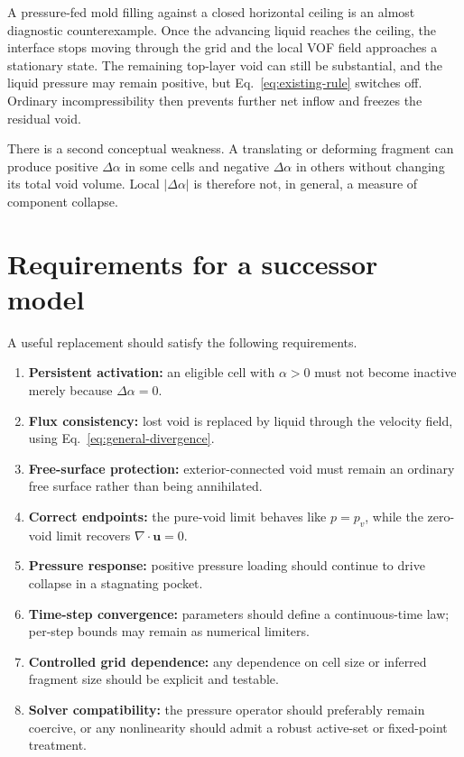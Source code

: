 \documentclass[11pt]{article}
\newcommand{\divg}{\nabla\!\cdot}
\newcommand{\uv}{\boldsymbol{u}}
\begin{document}
A pressure-fed mold filling against a closed horizontal ceiling is an almost diagnostic
counterexample.  Once the advancing liquid reaches the ceiling, the interface stops
moving through the grid and the local VOF field approaches a stationary state.  The
remaining top-layer void can still be substantial, and the liquid pressure may remain
positive, but Eq.~\eqref{eq:existing-rule} switches off.  Ordinary incompressibility then
prevents further net inflow and freezes the residual void.

There is a second conceptual weakness.  A translating or deforming fragment can produce
positive \(\Delta\alpha\) in some cells and negative \(\Delta\alpha\) in others without
changing its total void volume.  Local \(|\Delta\alpha|\) is therefore not, in general,
a measure of component collapse.

\section{Requirements for a successor model}

A useful replacement should satisfy the following requirements.
\begin{enumerate}
  \item \textbf{Persistent activation:} an eligible cell with \(\alpha>0\) must not
        become inactive merely because \(\Delta\alpha=0\).
  \item \textbf{Flux consistency:} lost void is replaced by liquid through the velocity
        field, using Eq.~\eqref{eq:general-divergence}.
  \item \textbf{Free-surface protection:} exterior-connected void must remain an
        ordinary free surface rather than being annihilated.
  \item \textbf{Correct endpoints:} the pure-void limit behaves like \(p=p_v\), while
        the zero-void limit recovers \(\divg\uv=0\).
  \item \textbf{Pressure response:} positive pressure loading should continue to drive
        collapse in a stagnating pocket.
  \item \textbf{Time-step convergence:} parameters should define a continuous-time law;
        per-step bounds may remain as numerical limiters.
  \item \textbf{Controlled grid dependence:} any dependence on cell size or inferred
        fragment size should be explicit and testable.
  \item \textbf{Solver compatibility:} the pressure operator should preferably remain
        coercive, or any nonlinearity should admit a robust active-set or fixed-point
        treatment.
\end{enumerate}
\end{document}
